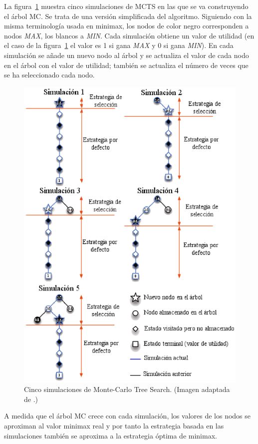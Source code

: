 La figura~\ref{fig:mcts2} muestra cinco simulaciones de MCTS en las que se va construyendo el árbol MC.
Se trata de una versión simplificada del algoritmo. 
Siguiendo con la misma terminología usada en minimax, los nodos de color negro corresponden a nodos \textit{MAX}, los blancos a \textit{MIN}.
Cada simulación obtiene un valor de utilidad (en el caso de la figura~\ref{fig:mcts2} el valor es 1 si gana \textit{MAX} y 0 si gana \textit{MIN}).
En cada simulación se añade un nuevo nodo al árbol y se actualiza el valor de cada nodo en el árbol con el valor de utilidad; también se actualiza el número de veces que se ha seleccionado cada nodo.
\begin{figure}[h]
	\centering
	\includegraphics[scale=1]{contenido/cap3/imagenes/mcts2.eps}
	\caption[Cinco simulaciones de Monte-Carlo Tree Search.]%
	{Cinco simulaciones de Monte-Carlo Tree Search. (Imagen adaptada de .)}
	\label{fig:mcts2}
\end{figure}
A medida que el árbol MC crece con cada simulación, los valores de los nodos se aproximan al valor minimax real y por tanto la estrategia basada en las simulaciones también se aproxima a la estrategia óptima de minimax.

